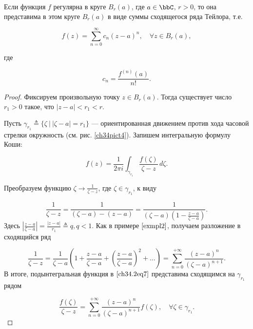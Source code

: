 \begin{thm} \label{abc29}
Если функция $f$ регулярна в круге $B_r(a)$, где $a \in \bbC$, $r > 0$, то она представима в этом круге $B_r(a)$ в виде суммы сходящегося ряда Тейлора, т.е.

\begin{equation} \label{ch34.2eq5}
f(z) = \sum\limits_{n = 0}^{\infty} c_n(z - a)^n, \quad \forall z \in B_r(a),
\end{equation}

где

\begin{equation} \label{ch34.2eq6}
c_n = \frac{f^{(n)}(a)}{n!}.
\end{equation}

\end{thm}
\begin{proof}
Фиксируем произвольную точку $z \in B_r(a)$. Тогда существует число $r_1 > 0$ такое, что $|z - a| < r_1 < r$.

Пусть $\gamma_{r_1} \triangleq \{\zeta \: \big| \: |\zeta - a| = r_1 \}$ — ориентированная движением против хода часовой стрелки окружность (см. рис. \ref{ch34pict4}). Запишем интегральную формулу Коши:

\begin{equation} \label{ch34.2eq7}
f(z) = \frac{1}{2 \pi i} \int_{\gamma_{r_1}} \frac{f(\zeta)}{\zeta - z} \,d\zeta.
\end{equation}

Преобразуем функцию $\zeta \to \frac{1}{\zeta - z}$, где $\zeta \in \gamma_{r_1}$, к виду

$$
\frac{1}{\zeta - z} = \frac{1}{(\zeta - a) - (z - a)} = \frac{1}{(\zeta - a)\left( 1 - \frac{z - a}{\zeta - a}\right)}.
$$
Здесь $\left|\frac{z - a}{\zeta - a} \right| = \frac{|z - a|}{r_1} \triangleq q, q < 1$. Как в примере $\ref{exmpl2}$, получаем разложение в сходящийся ряд

$$
\frac{1}{\zeta - z} = \frac{1}{\zeta - a} \left( 1 + \frac{z - a}{\zeta - a} + \left( \frac{z - a}{\zeta - a}\right)^2 + \ldots \right) = \sum\limits_{n = 0}^{+\infty} \frac{(z - a)^n}{(\zeta - a)^{n + 1}}.
$$
В итоге, подынтегральная функция в $\eqref{ch34.2eq7}$ представима сходящимся на $\gamma_{r_1}$ рядом

\begin{equation} \label{ch34.2eq8}
\frac{f(\zeta)}{\zeta - z} = \sum\limits_{n = 0}^{+\infty} \frac{(z - a)^n}{(\zeta - a)^{n + 1}} f(\zeta), \quad \forall \zeta \in \gamma_{r_1}.
\end{equation}


\end{proof}
